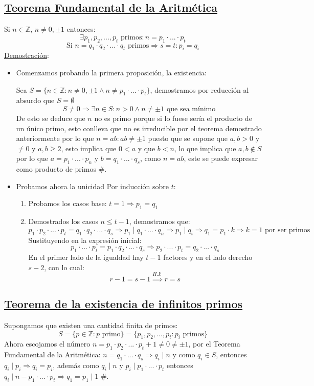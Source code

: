 \documentclass[10pt,a4paper,openright]{book}
\begin{document}
\subsection*{\underline{Teorema Fundamental de la Aritmética}}
Si $n\in \mathbb Z$, $n\neq 0, \pm 1$ entonces:
$$\exists p_1, p_2, ..., p_t \mbox{ primos}: n=p_1\cdot ... \cdot p_t$$
$$\mbox{Si }n=q_1\cdot q_2\cdot  ...\cdot  q_t \mbox{ primos}\Rightarrow s=t: p_i=q_i $$
\underline{Demostración}:
\begin{itemize}
\item Comenzamos probando la primera proposición, la existencia:\par
Sea $S=\{n\in \mathbb Z : n\neq 0, \pm 1 \wedge n\neq p_1\cdot ... \cdot p_t\}$, demostramos por reducción al absurdo que $S=\emptyset$
$$S\neq 0 \Rightarrow \exists n \in S : n>0 \wedge n\neq \pm 1 \mbox{ que sea mínimo}$$
De esto se deduce que $n$ no es primo porque si lo fuese sería el producto de un único primo, esto conlleva que no es irreducible por el teorema demostrado anteriormente por lo que $n=ab : ab\neq \pm 1$ puesto que se supone que $a,b>0$ y $\neq 0$ y $a,b\geq 2$, esto implica que $0<a$ y que $b<n$, lo que implica que $a,b\notin S$ por lo que $a=p_1\cdot ... \cdot p_n$ y $b=q_1\cdot ...\cdot q_s$, como $n=ab$, este se puede expresar como producto de primos \#.

\item Probamos ahora la unicidad
Por inducción sobre $t$:
\begin{enumerate}
\item Probamos los casos base: $t=1\Rightarrow p_1=q_1$

\item Demostrados los casos $n\leq t-1$, demostramos que:
$$p_1\cdot p_2 \cdot ... \cdot p_t=q_1\cdot q_2 \cdot ... \cdot q_s \Rightarrow p_1\mid q_1\cdot ... \cdot q_n\Rightarrow p_1\mid q_i \Rightarrow q_1=p_1\cdot k \Rightarrow k=1\mbox{ por ser primos}$$
Sustituyendo en la expresión inicial:
$$p_1\cdot ... \cdot p_t=p_1\cdot q_2\cdot ... \cdot q_s\Rightarrow p_2\cdot ... \cdot p_t=q_2\cdot ... \cdot q_s$$
En el primer lado de la igualdad hay $t-1$ factores y en el lado derecho $s-2$, con lo cual:
$$r-1=s-1\stackrel{H.I:}{\Rightarrow }r=s$$
\end{enumerate}
\end{itemize}

\subsection*{\underline{Teorema de la existencia de infinitos primos}}
Supongamos que existen una cantidad finita de primos:
$$S=\{p\in \mathbb Z: p \mbox{ primo}\}=\{p_1,p_2,...,p_t: p_i\mbox{ primos}\}$$
Ahora escojamos el número $n=p_1\cdot p_2\cdot ... \cdot p_t+1\neq 0\neq \pm 1$, por el Teorema Fundamental de la Aritmética: $n=q_1\cdot ... \cdot q_s\Rightarrow q_i\mid n$ y como $q_i\in S$, entonces $q_i\mid p_i\Rightarrow q_i=p_i$, además como $q_i\mid n$ y $p_i\mid p_1\cdot ...\cdot p_t$ entonces $q_i\mid n-p_1\cdot ...\cdot p_t\Rightarrow q_1=p_1\mid 1$ \#.
\end{document}
